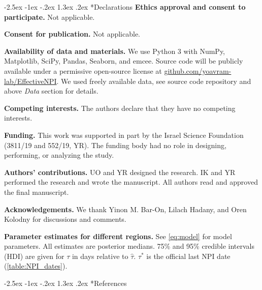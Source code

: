 \documentclass[12pt]{extarticle}
\makeatletter
\renewcommand\section{\@startsection {section}{1}{\z@}%
     {-2.5ex \@plus -1ex \@minus -.2ex}%
     {1.3ex \@plus.2ex}%
    {\Large\bfseries}}
\makeatother
\begin{document}
{\small
\section*{Declarations}
\textbf{Ethics approval and consent to participate.} Not applicable.

\textbf{Consent for publication.} Not applicable.

\textbf{Availability of data and materials.} We use Python 3 with NumPy, Matplotlib, SciPy, Pandas, Seaborn, and emcee.
Source code will be publicly available under a permissive open-source license at \href{http://github.com/yoavram-lab/EffectiveNPI}{github.com/yoavram-lab/EffectiveNPI}.
We used freely available data, see source code repository and above \emph{Data} section for details.

\textbf{Competing interests.} The authors declare that they have no competing interests.

\textbf{Funding.} This work was supported in part by the Israel Science Foundation (3811/19 and 552/19, YR). The funding body had no role in designing, performing, or analyzing the study.

\textbf{Authors' contributions.} UO and YR designed the research. IK and YR performed the research and wrote the manuscript. All authors read and approved the final manuscript.

\textbf{Acknowledgements.} 
We thank Yinon M. Bar-On, Lilach Hadany, and Oren Kolodny for discussions and comments. %
} %

\begin{landscape}
\begin{table}[]
\centering
\footnotesize{

}
\caption{
\textbf{Parameter estimates for different regions.}
See \autoref{eq:model} for model parameters.
All estimates are posterior medians.
75\% and 95\% credible intervals (HDI) are given for $\tau$ in days relative to $\hat{\tau}$.
$\tau^*$ is the official last NPI date (\autoref{table:NPI_dates}).
}
\label{table:estimated-params}
\end{table}
\end{landscape}




\section*{References}
\nolinenumbers

%

\end{document}
